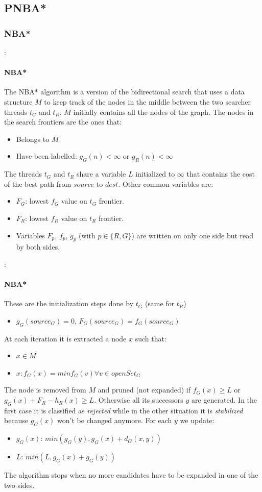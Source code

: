 \documentclass[12pt]{beamer}
\begin{document}
	\subsection{PNBA*}
	\subsubsection{NBA*}
	\begin{frame}{\secname : \subsecname}
		\framesubtitle{NBA*}
		The NBA* algorithm is a version of  the bidirectional search that uses a data
		structure $M$ to keep track of the nodes in the middle between the two searcher
		threads $t_G$ and $t_R$. $M$ initially contains all the nodes of the graph. The nodes
		in the search frontiers are the ones that:
		\begin{itemize}
		\item Belongs to $M$
		\item Have been labelled: $g_G(n) < \infty $ or $g_R(n) < \infty $
		\end{itemize}
		The threads $t_G$ and $t_R$ share a variable $L$ initialized to $\infty$ that contains
		the cost of the best path from $source$ to $dest$. Other common variables are:
		\begin{itemize}
		\item $F_G$: lowest $f_G$ value on $t_G$ frontier.
		\item $F_R$: lowest $f_R$ value on $t_R$ frontier.
		\item Variables $F_p$, $f_p$, $g_p$ (with $p \in \{R,G\}$) are written on only one
				side but read by both sides.
		\end{itemize}
	\end{frame}
	\begin{frame}{\secname : \subsecname}
		\framesubtitle{NBA*}
		These are the initialization steps done by $t_G$ (same for $t_R$)
		\begin{itemize}
		\item $g_G(source_G)=0$, $F_G(source_G)=f_G(source_G)$
		\end{itemize}
		At each iteration it is extracted a node $x$ such that:
		\begin{itemize}
		\item $x \in M$
		\item $x: f_G(x) = min f_G(v) \forall v \in openSet_G$ 
		\end{itemize}
		The node is removed from $M$ and pruned (not expanded) if $f_G(x) \ge L$ or
		$g_G(x)+F_R-h_R(x) \ge L$. Otherwise all its successors $y$ are generated. In the
		first case it is classified as \textit{rejected} while in the other situation it is
		\textit{stabilized} because $g_G(x)$ won't be changed anymore. For each $y$ we update:
		\begin{itemize}
		\item $g_G(x)$: $min(g_G(y), g_G(x) + d_G(x, y))$
		\item $L$: $min(L, g_G(x) + g_G(y))$
		\end{itemize}
		The algorithm stops when no more candidates have to be expanded in one of the two sides.
	\end{frame}
\end{document}
